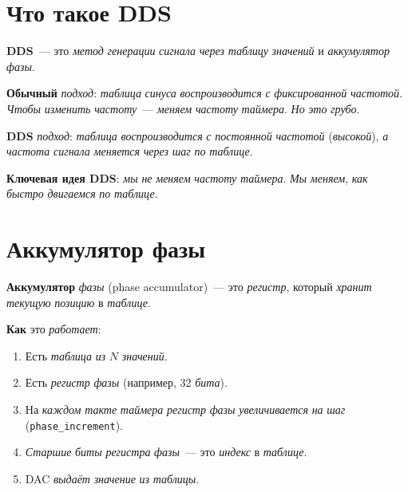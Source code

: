 \section{Что такое DDS}
\label{sec:dds-what}

\textbf{DDS}~--- это \emph{метод} \emph{генерации} \emph{сигнала}
\emph{через} \emph{таблицу} \emph{значений} и
\emph{аккумулятор} \emph{фазы}.

\textbf{Обычный} \emph{подход}: \emph{таблица} \emph{синуса}
\emph{воспроизводится} \emph{с} \emph{фиксированной}
\emph{частотой}. \emph{Чтобы} \emph{изменить} \emph{частоту}~---
\emph{меняем} \emph{частоту} \emph{таймера}. \emph{Но}
\emph{это} \emph{грубо}.

\textbf{DDS} \emph{подход}: \emph{таблица} \emph{воспроизводится}
\emph{с} \emph{постоянной} \emph{частотой} (\emph{высокой}),
\emph{а} \emph{частота} \emph{сигнала} \emph{меняется}
\emph{через} \emph{шаг} \emph{по} \emph{таблице}.

\begin{keybox}
\textbf{Ключевая идея DDS}: \emph{мы} \emph{не} \emph{меняем}
\emph{частоту} \emph{таймера}. \emph{Мы} \emph{меняем},
\emph{как} \emph{быстро} \emph{двигаемся} \emph{по}
\emph{таблице}.
\end{keybox}

\section{Аккумулятор фазы}
\label{sec:dds-phase}

\textbf{Аккумулятор} \emph{фазы} (phase accumulator)~---
это \emph{регистр}, который \emph{хранит} \emph{текущую}
\emph{позицию} в \emph{таблице}.

\textbf{Как} это \emph{работает}:
\begin{enumerate}
    \item Есть \emph{таблица} \emph{из} $N$ \emph{значений}.
    \item Есть \emph{регистр} \emph{фазы} (например, \num{32}
          \emph{бита}).
    \item На \emph{каждом} \emph{такте} \emph{таймера}
          \emph{регистр} \emph{фазы} \emph{увеличивается}
          \emph{на} \emph{шаг} (\texttt{phase\_increment}).
    \item \emph{Старшие} \emph{биты} \emph{регистра} \emph{фазы}~---
          это \emph{индекс} в \emph{таблице}.
    \item DAC \emph{выдаёт} \emph{значение} \emph{из} \emph{таблицы}.
\end{enumerate}

